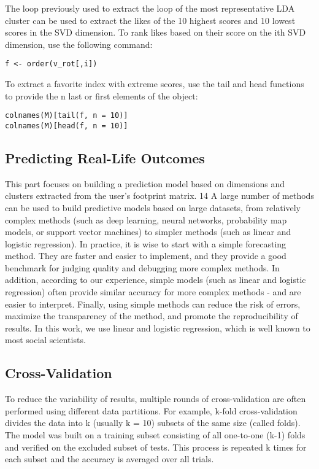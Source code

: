 The loop previously used to extract the loop of the most 
representative LDA cluster can be used to extract the likes of the
 10 highest scores and 10 lowest scores in the SVD dimension. To 
rank likes based on their score on the ith SVD dimension, use the 
following command:

\begin{verbatim}
f <- order(v_rot[,i])
\end{verbatim}

To extract a favorite index with extreme scores, use the tail and 
head functions to provide the n last or first elements of the 
object:

\begin{verbatim}
colnames(M)[tail(f, n = 10)]
colnames(M)[head(f, n = 10)]
\end{verbatim}

\subsection{Predicting Real-Life Outcomes}

This part focuses on building a prediction model based on 
dimensions and clusters extracted from the user's footprint matrix.
 14 A large number of methods can be used to build predictive 
models based on large datasets, from relatively complex methods 
(such as deep learning, neural networks, probability map models, or
 support vector machines) to simpler methods (such as linear and 
logistic regression). In practice, it is wise to start with a 
simple forecasting method. They are faster and easier to implement,
 and they provide a good benchmark for judging quality and 
debugging more complex methods. In addition, according to our 
experience, simple models (such as linear and logistic regression)
 often provide similar accuracy for more complex methods - and are
 easier to interpret. Finally, using simple methods can reduce the
 risk of errors, maximize the transparency of the method, and 
promote the reproducibility of results. In this work, we use linear
 and logistic regression, which is well known to most social 
scientists.

\subsection{Cross-Validation}

To reduce the variability of results, multiple rounds of 
cross-validation are often performed using different data 
partitions. For example, k-fold cross-validation divides the data 
into k (usually k = 10) subsets of the same size (called folds). 
The model was built on a training subset consisting of all 
one-to-one (k-1) folds and verified on the excluded subset of 
tests. This process is repeated k times for each subset and the 
accuracy is averaged over all trials.

